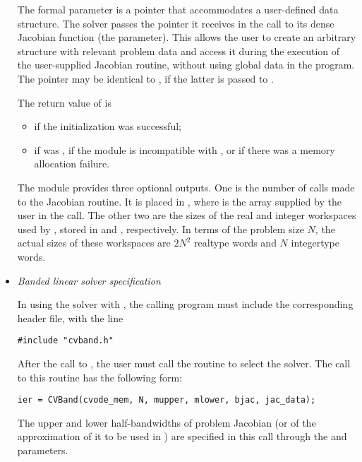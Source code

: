 \begin{itemize}
  The
   formal parameter  is a pointer that
  accommodates a user-defined data structure. The {\cvdense} solver
  passes the pointer it receives in the  call to its dense
  Jacobian function (the  parameter). This allows the user to
  create an arbitrary structure with relevant problem data and access it
  during the execution of the user-supplied Jacobian routine, without
  using global data in the program.  The pointer  may be
  identical to , if the latter is passed to
  .
  
  The return value  of  is
  \begin{itemize}
  \item {}
    if the {\cvdense} initialization was successful;
  \item {}
    if  was , if the {\nvector} module is incompatible 
    with {\cvdense}, or if there was a memory allocation failure.
  \end{itemize}
  
  The {\cvdense} module provides three optional outputs.
  One is the number of calls made to the Jacobian routine. It is placed
  in \id{iopt[}\id{]}, where  is the array supplied by the
  user in the  call.  The other two are the sizes of the
  real and integer workspaces used by {\cvdense}, stored in
  \id{iopt[}\id{]} and \id{iopt[}\id{]},
  respectively.
  In  
  terms of the problem size $N$, the actual sizes of these workspaces are 
  $2N^2$ realtype words and $N$ integertype words.
%
%
\item {\em Banded linear solver specification}
  
  In using the {\cvband} solver with {\cvode}, the calling program must
  include the corresponding header file, with the line
\begin{verbatim}
#include "cvband.h"
\end{verbatim}
  \par After the call to , the user must call the routine 
  to select the {\cvband} solver. The call to this routine has the following form:
\begin{verbatim}
ier = CVBand(cvode_mem, N, mupper, mlower, bjac, jac_data);
\end{verbatim}
  The upper and lower half-bandwidths of problem Jacobian (or of the
  approximation of it to be used in {\cvode}) are specified in this call
  through the  and  parameters.
  

\end{itemize}
